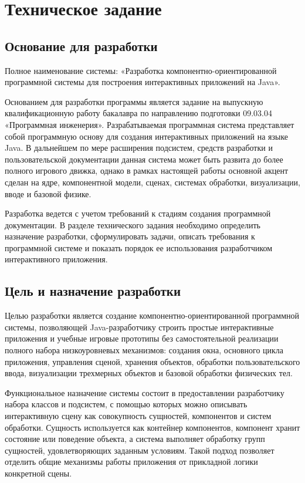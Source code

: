 \section{Техническое задание}

\subsection{Основание для разработки}

Полное наименование системы: «Разработка компонентно-ориентированной программной системы для построения интерактивных приложений на Java».

Основанием для разработки программы является задание на выпускную квалификационную работу бакалавра по направлению подготовки 09.03.04 «Программная инженерия». Разрабатываемая программная система представляет собой программную основу для создания интерактивных приложений на языке Java. В дальнейшем по мере расширения подсистем, средств разработки и пользовательской документации данная система может быть развита до более полного игрового движка, однако в рамках настоящей работы основной акцент сделан на ядре, компонентной модели, сценах, системах обработки, визуализации, вводе и базовой физике.

Разработка ведется с учетом требований к стадиям создания программной документации. В разделе технического задания необходимо определить назначение разработки, сформулировать задачи, описать требования к программной системе и показать порядок ее использования разработчиком интерактивного приложения.

\subsection{Цель и назначение разработки}

Целью разработки является создание компонентно-ориентированной программной системы, позволяющей Java-разработчику строить простые интерактивные приложения и учебные игровые прототипы без самостоятельной реализации полного набора низкоуровневых механизмов: создания окна, основного цикла приложения, управления сценой, хранения объектов, обработки пользовательского ввода, визуализации трехмерных объектов и базовой обработки физических тел.

Функциональное назначение системы состоит в предоставлении разработчику набора классов и подсистем, с помощью которых можно описывать интерактивную сцену как совокупность сущностей, компонентов и систем обработки. Сущность используется как контейнер компонентов, компонент хранит состояние или поведение объекта, а система выполняет обработку групп сущностей, удовлетворяющих заданным условиям. Такой подход позволяет отделить общие механизмы работы приложения от прикладной логики конкретной сцены.

